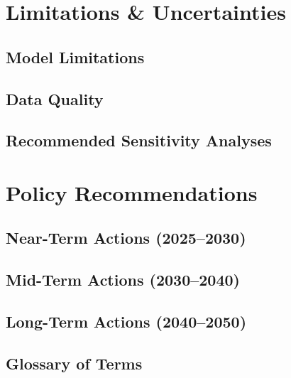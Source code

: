 \documentclass[11pt,a4paper]{report}
\begin{document}
\part{Limitations \& Uncertainties}
\label{part:limitations}

\chapter{Model Limitations}
\chapter{Data Quality}
\chapter{Recommended Sensitivity Analyses}

\part{Policy Recommendations}
\label{part:policy}

\chapter{Near-Term Actions (2025--2030)}
\chapter{Mid-Term Actions (2030--2040)}
\chapter{Long-Term Actions (2040--2050)}

\appendix

\chapter{Glossary of Terms}
\end{document}
